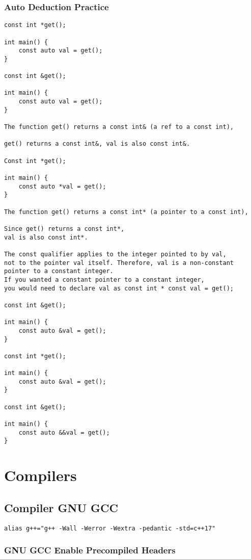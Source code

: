 \documentclass[openany]{report}
\begin{document}
\subsection{Auto Deduction Practice}

\begin{verbatim}
const int *get();

int main() {
    const auto val = get();
}

const int &get();

int main() {
    const auto val = get();
}

The function get() returns a const int& (a ref to a const int),

get() returns a const int&, val is also const int&.

Const int *get();

int main() {
    const auto *val = get();
}

The function get() returns a const int* (a pointer to a const int),

Since get() returns a const int*,
val is also const int*.

The const qualifier applies to the integer pointed to by val,
not to the pointer val itself. Therefore, val is a non-constant pointer to a constant integer.
If you wanted a constant pointer to a constant integer,
you would need to declare val as const int * const val = get();

const int &get();

int main() {
    const auto &val = get();
}

const int *get();

int main() {
    const auto &val = get();
}

const int &get();

int main() {
    const auto &&val = get();
}
\end{verbatim}

\chapter{Compilers}

\section{Compiler GNU GCC}

\begin{verbatim}
alias g++="g++ -Wall -Werror -Wextra -pedantic -std=c++17"
\end{verbatim}

\subsection{GNU GCC Enable Precompiled Headers}
\end{document}
